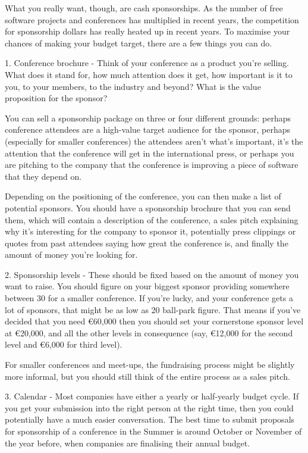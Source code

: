        What you really want, though, are cash sponsorships. As the number of
free software projects and conferences has multiplied in recent years,
the competition for sponsorship dollars has really heated up in recent
years. To maximise your chances of making your budget target, there are
a few things you can do.

               1. Conference brochure - Think of your conference as a product you're
selling. What does it stand for, how much attention does it get, how
important is it to you, to your members, to the industry and beyond?
What is the value proposition for the sponsor?

               You can sell a sponsorship package on three or four different grounds:
perhaps conference attendees are a high-value target audience for the
sponsor, perhaps (especially for smaller conferences) the attendees
aren't what's important, it's the attention that the conference will get
in the international press, or perhaps you are pitching to the company
that the conference is improving a piece of software that they depend on.

               Depending on the positioning of the conference, you can then make a
list of potential sponsors. You should have a sponsorship brochure that
you can send them, which will contain a description of the conference, a
sales pitch explaining why it's interesting for the company to sponsor
it, potentially press clippings or quotes from past attendees saying how
great the conference is, and finally the amount of money you're looking for.

               2. Sponsorship levels - These should be fixed based on the amount of
money you want to raise. You should figure on your biggest sponsor
providing somewhere between 30%
for a smaller conference. If you're lucky, and your conference gets a
lot of sponsors, that might be as low as 20%
ball-park figure. That means if you've decided that you need €60,000
then you should set your cornerstone sponsor level at €20,000, and all
the other levels in consequence (say, €12,000 for the second level and
€6,000 for third level).

               For smaller conferences and meet-ups, the fundraising process might be
slightly more informal, but you should still think of the entire process
as a sales pitch.


               3. Calendar - Most companies have either a yearly or half-yearly
budget cycle. If you get your submission into the right person at the
right time, then you could potentially have a much easier conversation.
The best time to submit proposals for sponsorship of a conference in the
Summer is around October or November of the year before, when companies
are finalising their annual budget.

